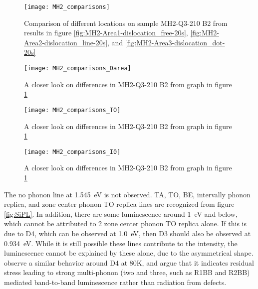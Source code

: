 \begin{figure}[H]
\centering
\texttt{[image: MH2\_comparisons]}
\caption[MH2-Q3-210 comparisons]{Comparison of different locations on sample MH2-Q3-210 B2 from results in figure \ref{fig:MH2-Area1-dislocation_free-20s}, \ref{fig:MH2-Area2-dislocation_line-20s}, and \ref{fig:MH2-Area3-dislocation_dot-20s} }
\label{fig:MH2_comparisons}%
\end{figure}


\begin{figure}[H]
\centering
\texttt{[image: MH2\_comparisons\_Darea]}
\caption[MH2-Q3-210 comparisons close]{A closer look on differences in MH2-Q3-210 B2 from graph in figure \ref{fig:MH2_comparisons} }
\label{fig:MH2_comparisons_Darea}%
\end{figure}

\begin{figure}[H]
\centering
\texttt{[image: MH2\_comparisons\_TO]}
\caption[MH2-Q3-210 comparisons close]{A closer look on differences in MH2-Q3-210 B2 from graph in figure \ref{fig:MH2_comparisons} } 
\label{fig:MH2_comparisons_TO}%
\end{figure}

\begin{figure}[H]
\centering
\texttt{[image: MH2\_comparisons\_I0]}
\caption[MH2-Q3-210 comparisons close]{A closer look on differences in MH2-Q3-210 B2 from graph in figure \ref{fig:MH2_comparisons} } 
\label{fig:MH2_comparisons_I0}%
\end{figure}


The no phonon line at 1.545~eV is not observed. TA, TO, BE, intervally phonon replica, and zone center phonon TO replica lines are recognized from figure \ref{fig:SiPL}. In addition, there are some luminescence around 1~eV and below, which cannot be attributed to 2 zone center phonon TO replica alone. If this is due to D4, which can be observed at 1.0~eV, then D3 should also be observed at 0.934~eV. While it is still possible these lines contribute to the intensity, the luminescence cannot be explained by these alone, due to the asymmetrical shape. \cite{arguirov07} observe a similar behavior around D4 at 80K, and argue that it indicates residual stress leading to strong multi-phonon (two and three, such as R1BB and R2BB) mediated band-to-band luminescence rather than radiation from defects. 

